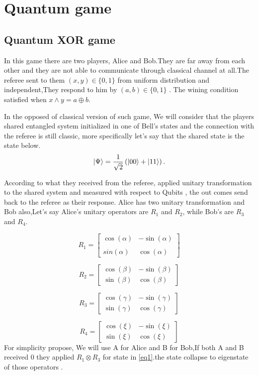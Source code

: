 \chapter{Quantum game}
\section{Quantum XOR game}
In this game there are  two players, Alice and Bob.They are far away from each other and they are not able to communicate through classical channel at all.The referee sent to them    $(x,y)\in \{0,1\}$  from uniform distribution and independent\citep{PhysRevA.93.022333},They respond  to him by $(a,b)\in \{0,1\}$ .  The   wining  condition  satisfied when $x\wedge y= a\oplus b$.

In the opposed of classical version of such game, We will consider that the players shared entangled system initialized in one of Bell's states and the connection with the referee is still classic, more specifically let's say that the shared state is the state below.
\begin{equation}
\ket{\Psi }= \frac{1}{\sqrt{2}}\left( \ket{00} +\ket{11} \right)\label{eq1} .
\end{equation}
	  
	  
According to what they received from the referee, applied unitary transformation to the shared system  and measured with respect to  Qubits , the out comes send back to the referee as their response. Alice has two unitary transformation and Bob also,Let's say Alice's unitary operators  are $R_1$ and $R_2$, while Bob's are $R_3$ and $R_4$.
	 
$$	R_1= \begin{bmatrix}
\cos(\alpha) & -\sin(\alpha)\\
\\sin(\alpha) &  \cos(\alpha)
\end{bmatrix}$$	

	
 $$	R_2= \begin{bmatrix}
 \cos(\beta)  &  -\sin(\beta) \\
  \sin(\beta) &  \cos(\beta)
 \end{bmatrix}
 $$
 	

 
 $$
 R_3= \begin{bmatrix}
 \cos(\gamma)  &  -\sin(\gamma) \\
 \sin(\gamma)  &  \cos(\gamma)
 \end{bmatrix}
 $$	

$$
R_4= \begin{bmatrix}
\cos(\xi)  &  -\sin(\xi) \\
\sin(\xi) &  \cos(\xi)
\end{bmatrix}
$$
For simplicity propose,  We will use A for Alice and B for Bob,If both A and B  received $0$ they applied $R_1\otimes R_3$ for  state in \ref{eq1}.the state collapse to eigenstate of those operators .



